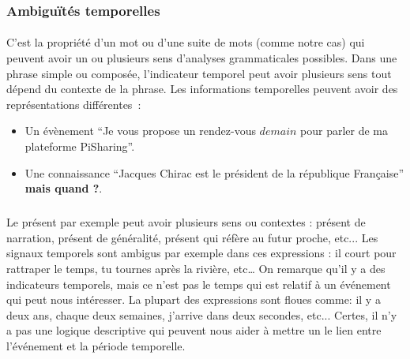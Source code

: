 \documentclass[12pt,a4	]{report}
\begin{document}
\subsubsection*{Ambiguïtés temporelles}
\paragraph{}
C'est la propriété d'un mot ou d'une suite de mots (comme notre cas) qui peuvent avoir un ou plusieurs sens d'analyses grammaticales possibles. Dans une phrase simple ou composée, l'indicateur temporel peut avoir plusieurs sens tout dépend du contexte de la phrase.
\newline
Les informations temporelles peuvent avoir des représentations différentes~: 
\begin{itemize}
\item Un évènement ``Je vous propose un rendez-vous $demain$ pour parler de ma plateforme PiSharing''. \item Une connaissance ``Jacques Chirac est le président de la république Française'' \textbf{ mais quand ?}.
\end{itemize}

\subparagraph{} 
Le présent par exemple peut avoir plusieurs sens ou contextes : présent de narration, présent de généralité, présent qui réfère au futur proche, etc...
Les signaux temporels sont ambigus par exemple dans ces expressions : il court pour rattraper le temps, tu tournes après la rivière, etc… On remarque qu'il y a des indicateurs temporels, mais ce n'est pas le temps qui est relatif à un événement qui peut nous intéresser.
La plupart des expressions sont floues comme: il y a deux ans, chaque deux semaines, j’arrive dans deux secondes, etc... Certes, il n'y a pas une logique descriptive qui peuvent nous aider à mettre un le lien entre l'événement et la période temporelle.
\end{document}
